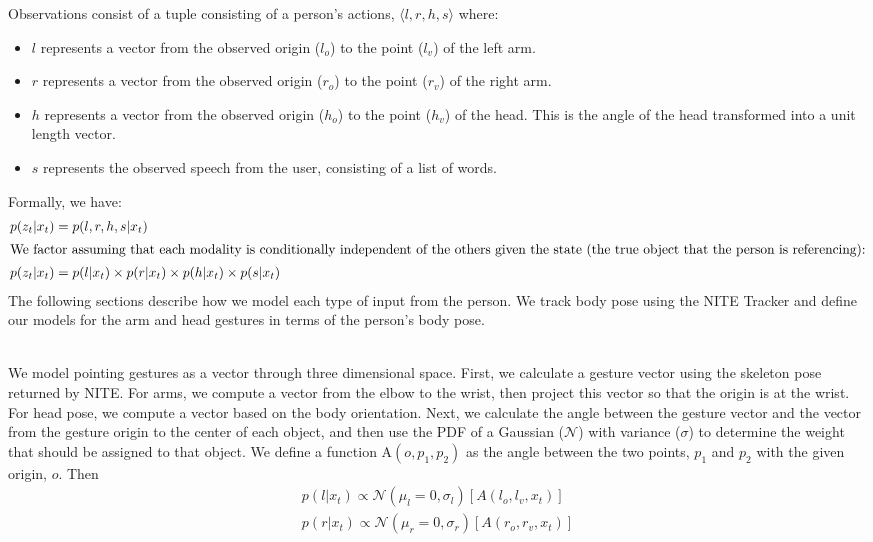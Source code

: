 \documentclass[a4paper, 11pt]{article} %
\begin{document}
Observations consist of a tuple consisting of a person's actions,
$\langle l, r, h, s\rangle $ where:
\begin{itemize}
    \item $l$ represents a vector from the observed origin ($l_o$) to the point ($l_v$) of the left arm.
    \item $r$ represents a vector from the observed origin ($r_o$) to the point ($r_v$) of the right arm.
    \item $h$ represents a vector from the observed origin ($h_o$) to the point ($h_v$) of the head. This is the angle of the head transformed into a unit length vector.
    \item $s$ represents the observed speech from the user,
          consisting of a list of words.
    \end{itemize}

Formally, we have:
\begin{align}
p(z_t | x_t) &= p(l, r, h, s | x_t)\\
\intertext{We factor assuming that each modality is conditionally independent of the others given the state (the true object that the person is referencing):}
p(z_t | x_t) &= p(l | x_t) \times p(r | x_t) \times p(h | x_t) \times p(s | x_t)
\end{align}
\noindent The following sections \(  \)describe how we model each type of
input from the person.  We track body pose using the NITE
Tracker and define our models for the arm and head
gestures in terms of the person's body pose.\\\\

We model pointing gestures as a vector
through three dimensional space.  First, we calculate a gesture vector
using the skeleton pose returned by NITE.  For arms, we compute a
vector from the elbow to the wrist, then project this vector so that the origin is at the wrist.  For head pose, we compute a
vector based on the body orientation. Next, we calculate the angle between the gesture
vector and the vector from the gesture origin to the center of each object, and then use the PDF of a Gaussian ($\mathcal{N}$) with
variance ($\sigma$) to determine the weight that should be assigned to
that object. We define a function $\mbox{A}(o, p_1, p_2)$ as the angle
between the two points, $p_1$ and $p_2$ with the given origin, $o$.
Then
\begin{align}
p(l | x_t) \propto \mathcal{N}(\mu_l=0, \sigma_l)[A(l_o, l_v, x_t)]\\
p(r | x_t) \propto \mathcal{N}(\mu_r=0, \sigma_r)[A(r_o, r_v, x_t)]
\end{align}
\end{document}
